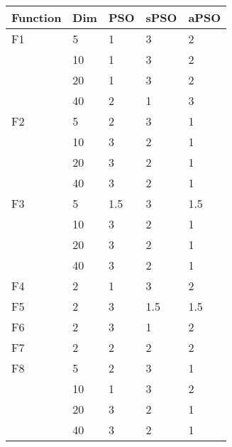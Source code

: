 \begin{longtable}{|l|l|l|l|l|}
\toprule
Function     & Dim & PSO  & sPSO             & aPSO  \\ \midrule
\endhead
\midrule
\endfoot
F1           & 5   & 1    & 3                & 2                \\ \cmidrule{2-5}
             & 10  & 1    & 3                & 2                \\ \cmidrule{2-5}
             & 20  & 1    & 3                & 2                \\ \cmidrule{2-5}
             & 40  & 2    & 1                & 3                \\ \midrule
F2           & 5   & 2    & 3                & 1                \\ \cmidrule{2-5}
             & 10  & 3    & 2                & 1                \\ \cmidrule{2-5}
             & 20  & 3    & 2                & 1                \\ \cmidrule{2-5}
             & 40  & 3    & 2                & 1                \\ \midrule
F3           & 5   & 1.5  & 3                & 1.5              \\ \cmidrule{2-5}
             & 10  & 3    & 2                & 1                \\ \cmidrule{2-5}
             & 20  & 3    & 2                & 1                \\ \cmidrule{2-5}
             & 40  & 3    & 2                & 1                \\ \midrule
F4           & 2   & 1    & 3                & 2                \\ \midrule
F5           & 2   & 3    & 1.5              & 1.5              \\ \midrule
F6           & 2   & 3    & 1                & 2                \\ \midrule
F7           & 2   & 2    & 2                & 2                \\ \midrule
F8           & 5   & 2    & 3                & 1                \\ \cmidrule{2-5}
             & 10  & 1    & 3                & 2                \\ \cmidrule{2-5}
             & 20  & 3    & 2                & 1                \\ \cmidrule{2-5}
             & 40  & 3    & 2                & 1                \\ \midrule

\end{longtable}
